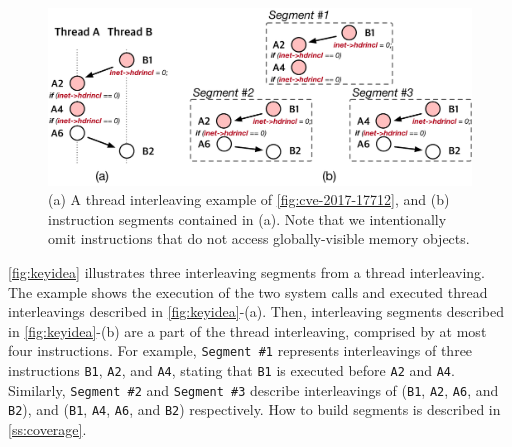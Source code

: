 %
\begin{figure}[t]
  \centering
  \includegraphics[width=0.99\linewidth]{fig/intuition.pdf}
  \caption{(a) A thread interleaving example of
    \autoref{fig:cve-2017-17712}, and (b) instruction segments
    contained in (a).  Note that we intentionally omit instructions
    that do not access globally-visible memory objects.}
  \label{fig:keyidea}
\end{figure}
%
\autoref{fig:keyidea} illustrates three interleaving segments 
from a thread interleaving.%
%
The example shows the execution of the two system calls 
and executed thread interleavings described in
\autoref{fig:keyidea}-(a).
%
Then, interleaving segments described in \autoref{fig:keyidea}-(b) are
a part of the thread interleaving, comprised by at most four instructions.
%
For example, \texttt{Segment \#1} represents interleavings of three
instructions \texttt{B1}, \texttt{A2}, and \texttt{A4}, stating that
\texttt{B1} is executed before \texttt{A2} and \texttt{A4}.
%
Similarly, \texttt{Segment \#2} and \texttt{Segment \#3} describe
interleavings of (\texttt{B1}, \texttt{A2}, \texttt{A6}, and
\texttt{B2}), and (\texttt{B1}, \texttt{A4}, \texttt{A6}, and
\texttt{B2}) respectively.
How to build segments is described in \autoref{ss:coverage}.

%
%
%


